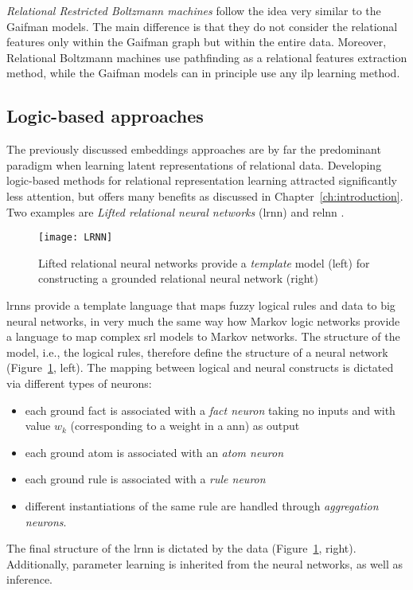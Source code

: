 \textit{Relational Restricted Boltzmann machines} follow the idea very similar to the Gaifman models.
The main difference is that they do not consider the relational features only within the Gaifman graph but within the entire data.
Moreover, Relational Boltzmann machines use pathfinding as a relational features extraction method, while the Gaifman models can in principle use any \gls{ilp} learning method.






\subsection{Logic-based approaches}


The previously discussed embeddings approaches are by far the predominant paradigm when learning latent representations of relational data.
Developing logic-based methods for relational representation learning attracted significantly less attention, but offers many benefits as discussed in Chapter~\ref{ch:introduction}.
Two examples are \textit{Lifted relational neural networks} (\gls{lrnn}) \cite{LRNN} and \gls{relnn} \cite{Kazemi2018}.

\begin{figure}
	\medskip
	\centering
	\texttt{[image: LRNN]}
	\caption[Lifted relational neural networks]{Lifted relational neural networks provide a \textit{template} model (left) for constructing a grounded relational neural network (right)~\cite{LRNN}\label{fig:lrnn}}
\end{figure}



\gls{lrnn}s provide a template language that maps  fuzzy logical rules and data to big neural networks, in very much the same way how Markov logic networks provide a language to map complex \gls{srl} models to Markov networks.
The structure of the model, i.e.,  the logical rules, therefore define the structure of a neural network (Figure~\ref{fig:lrnn}, left).
The mapping between logical and neural constructs is dictated via different types of neurons:
\begin{itemize}
	\item each ground fact is associated with a \textit{fact neuron} taking no inputs and with value $w_k$ (corresponding to a weight in a \gls{ann}) as output
	\item each ground atom is associated with an \textit{atom neuron}
	\item each ground rule is associated with a \textit{rule neuron}
	\item different instantiations of the same rule are handled through \textit{aggregation neurons}.
\end{itemize}
The final structure of the \gls{lrnn} is dictated by the data (Figure~\ref{fig:lrnn}, right).
Additionally, parameter learning is inherited from the neural networks, as well as inference.




